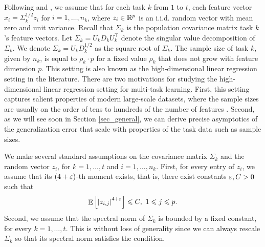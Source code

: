 Following \citet{HMRT19} and \citet{BLLT20},
we assume that for each task $k$ from $1$ to $t$, each feature vector $x_i = \Sigma^{1/2}_k z_i$ for $i = 1, \dots, n_k$, where $z_i\in\mathbb{R}^p$ is an i.i.d. random vector with  mean zero and unit variance.
Recall that $\Sigma_k$ is the population covariance matrix task $k$'s feature vectors.
Let $\Sigma_k = U_k D_k U_k^{\top}$ denote the singular value decomposition of $\Sigma_k$.
We denote $\Sigma_k = U_k D_k^{1/2}$ as the square root of $\Sigma_k$.
The sample size of task $k$, given by $n_k$, is equal to $\rho_k\cdot p$ for a fixed value $\rho_k$ that does not grow with feature dimension $p$.
This setting is also known as the high-dimensional linear regression setting in the literature.
There are two motivations for studying the high-dimensional linear regression setting for multi-task learning.
First, this setting captures salient properties of modern large-scale datasets, where the sample sizes are usually on the order of tens to hundreds of the number of features \cite{sur2019modern}.
Second, as we will see soon in Section \ref{sec_general}, we can derive precise asymptotics of the generalization error that scale with properties of the task data such as sample sizes.

We make several standard assumptions on the covariance matrix $\Sigma_k$ and the random vector $z_i$, for $k = 1,\dots, t$ and $i = 1,\dots, n_k$.
First, for every entry of $z_i$, we assume that its $(4+{\varepsilon})$-th moment exists, that is, there exist constants ${\varepsilon}, C > 0$ such that
\begin{equation}\label{assmAhigh}
	\mathop{\mathbb{E}}\left[ \left\lvert z_{i,j}\right\rvert^{4+{\varepsilon}} \right] \leqslant C,\ 1\leqslant j \leqslant p.
\end{equation}
Second, we assume that the spectral norm of $\Sigma_k$ is bounded by a fixed constant, for every $k = 1,\dots, t$.
This is without loss of generality since we can always rescale $\Sigma_k$ so that its spectral norm satisfies the condition.

